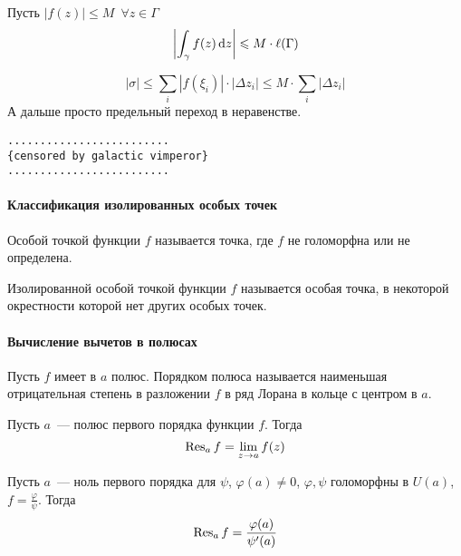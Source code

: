 \documentclass[12pt,timbord]{../../../notes}
\begin{document}
\begin{cor}\label{cor:tfcv::compint::length}
  Пусть $|f(z)| \leqslant M\;\: \forall z \in \Gamma$
  \[
    \left|\int_\gamma f(z) \,\mathrm{d} z\right| \leqslant M  \cdot \ell(\Gamma)
  \]
\end{cor}
\begin{itlproof}
  \[
    |\sigma| \leqslant \sum_{i} |f(\xi_i)| \cdot |\Delta z_i| \leqslant M \cdot \sum_i |\Delta
    z_i|
  \]
  А дальше просто  предельный переход в неравенстве.
\end{itlproof}

\begin{verbatim}
.........................
{censored by galactic vimperor}
.........................
\end{verbatim}


\setcounter{paragraph}{41}
\paragraph{Классификация изолированных особых точек}
\label{par:tfcv::singclass}

\begin{defn}\label{defn:tfcv::singclass::sing}
  Особой точкой функции $f$ называется точка, где $f$ не голоморфна или не определена.
\end{defn}

\begin{defn}\label{defn:tfcv::singclass::isolsing}
  Изолированной особой точкой функции $f$ называется особая точка, в некоторой окрестности которой
  нет других особых точек.
\end{defn}

\setcounter{paragraph}{45}

\paragraph{Вычисление вычетов в полюсах}
\label{par:tfcv::resuduepole}

\begin{defn}\label{defn:tfcv::resuduepole::polord}
  Пусть $f$ имеет в $a$ полюс.
  Порядком полюса называется наименьшая отрицательная степень в разложении $f$ в ряд Лорана в
  кольце с центром в $a$.
\end{defn}

\begin{thrm}\label{thrm:tfcv::resuduepole::firt}
  Пусть $a$~--- полюс первого порядка функции $f$. Тогда
  \[
    \operatorname{Res}_a f =  \lim_{z\to a} f(z)
  \]
\end{thrm}
\begin{thrm}\label{thrm:tfcv::resuduepole::frac}
  Пусть $a$~--- ноль первого порядка для $\psi$, $\varphi(a) \neq 0$, $\varphi, \psi$ голоморфны в
  $U(a)$, $f = \frac{\varphi}{\psi}$. Тогда
  \[
    \operatorname{Res}_a f =  \frac{\varphi(a)}{\psi'(a)}
  \]
\end{thrm}
\end{document}
